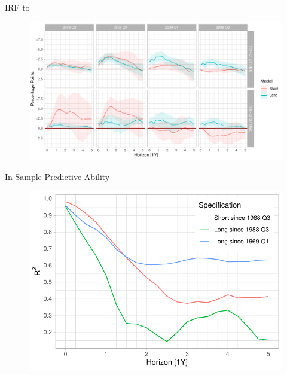 \documentclass[10pt,aspectratio=169]{beamer}
\begin{document}
\begin{frame}{IRF to}
    \begin{figure}
        \begin{minipage}{.96\textwidth}
            \includegraphics[width=\textwidth]{irfs_combined_gfc_plot.pdf}
        \end{minipage}
    \end{figure}
\end{frame}

\begin{frame}{In-Sample Predictive Ability}
    \begin{figure}
        \begin{minipage}{0.7\textwidth}
            \includegraphics[width=\textwidth]{r_squares_plot.pdf}
        \end{minipage}
    \end{figure}
\end{frame}


\begin{frame}
\end{frame}
\end{document}
